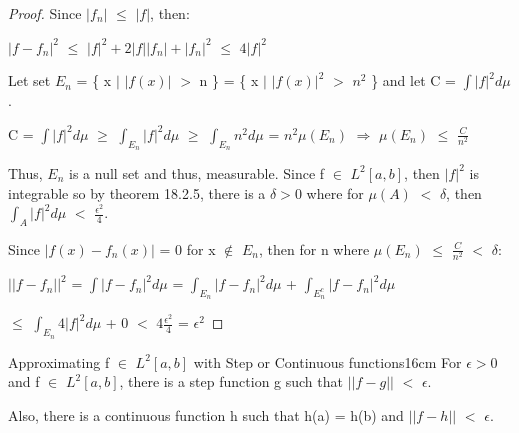     \begin{proof}
        Since $|f_n|$ $\leq$ $|f|$, then:

        \hspace{0.5cm}
        $|f - f_n|^2$
        $\leq$ $|f|^2 + 2|f||f_n| + |f_n|^2$
        $\leq$ $4|f|^2$

        Let set $E_n$ = \{ x $|$ $|f(x)|$ $>$ n \}
        = \{ x $|$ $|f(x)|^2$ $>$ $n^2$ \} and let C = $\int |f|^2 d\mu$.

        \hspace{0.5cm}
        C = $\int |f|^2 d\mu$
        $\geq$ $\int_{E_n} |f|^2 d\mu$
        $\geq$ $\int_{E_n} n^2 d\mu$
        = $n^2 \mu(E_n)$
        \hspace{0.5cm}
        $\Rightarrow$
        \hspace{0.5cm}
        $\mu(E_n)$ $\leq$ $\frac{C}{n^2}$

        Thus, $E_n$ is a null set and thus, measurable.
        Since f $\in$ $L^2[a,b]$, then $|f|^2$ is integrable
        so by {\color{red} theorem 18.2.5}, there is a $\delta > 0$
        where for $\mu(A)$ $<$ $\delta$, then
        $\int_A |f|^2 d\mu$ $<$ $\frac{\epsilon^2}{4}$.
        
        Since $|f(x) - f_n(x)|$ = 0 for x $\not \in$ $E_n$,
        then for n where $\mu(E_n)$ $\leq$ $\frac{C}{n^2}$ $<$ $\delta$:

        \hspace{0.5cm}
        $||f - f_n||^2$
        = $\int |f - f_n|^2 d\mu$
        = $\int_{E_n} |f - f_n|^2 d\mu$
            + $\int_{E_n^c} |f - f_n|^2 d\mu$

        \hspace{2.4cm}
        $\leq$ $\int_{E_n} 4|f|^2 d\mu$ + 0
        $<$ $4\frac{\epsilon^2}{4}$
        = $\epsilon^2$
    \end{proof}

    \vspace{0.5cm}



    \begin{wtheorem}{Approximating f $\in$ $L^2[a,b]$ with Step or
    Continuous functions}{16cm}
        For $\epsilon > 0$ and f $\in$ $L^2[a,b]$, there is a step function
        g such that $||f-g||$ $<$ $\epsilon$.

        Also, there is a continuous function h such that h(a) = h(b) and
        $||f-h||$ $<$ $\epsilon$.
    \end{wtheorem}

